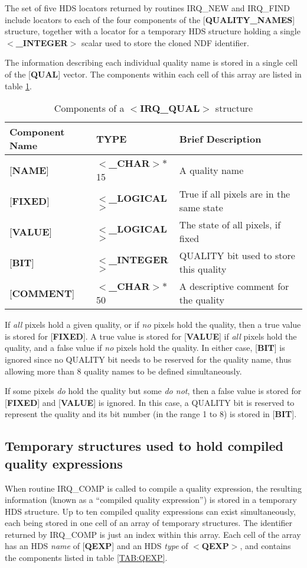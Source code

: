 The set of five HDS locators returned by routines IRQ\_NEW and IRQ\_FIND include
locators to each of the four components of the {[}{\bf QUALITY\_NAMES}{]}
structure, together with a locator for a temporary HDS structure holding a
single $<${\bf \_INTEGER}$>$ scalar used to store the cloned NDF identifier. 

The information describing each individual quality name is stored in a single
cell of the {[}{\bf QUAL}{]} vector. The components within each cell of this 
array are listed in table \ref {TAB:QUAL}.

\begin{table}[htb]
\centering
\caption{Components of a $<${\bf IRQ\_QUAL}$>$ structure}
\label{TAB:QUAL}
\begin{tabular}{|l|l|l|}
\hline
Component Name & TYPE & Brief Description \\ \hline
{[}{\bf NAME}{]} & $<${\bf \_CHAR}$>*$15 & A quality name \\
{[}{\bf FIXED}{]} & $<${\bf \_LOGICAL}$>$ & True if all pixels are in the same 
state\\
{[}{\bf VALUE}{]} & $<${\bf \_LOGICAL}$>$ & The state of all pixels, if fixed\\
{[}{\bf BIT}{]} & $<${\bf \_INTEGER}$>$ & QUALITY bit used to store this 
quality\\
{[}{\bf COMMENT}{]} & $<${\bf \_CHAR}$>*$50 & A descriptive comment for the 
quality\\
\hline
\end{tabular}
\end{table}

If {\em all} pixels hold a given quality, or if {\em no} pixels hold the
quality, then a true value is stored for {[}{\bf FIXED}{]}. A true value is
stored for {[}{\bf VALUE}{]} if {\em all} pixels hold the quality, and a false
value if {\em no} pixels hold the quality. In either case, {[}{\bf BIT}{]} is
ignored since no QUALITY bit needs to be reserved for the quality name, thus
allowing more than 8 quality names to be defined simultaneously. 

If some pixels {\em do} hold the quality but some {\em do not}, then a false 
value is stored for {[}{\bf FIXED}{]} and {[}{\bf VALUE}{]} is ignored. In this 
case, a QUALITY bit is reserved to represent the quality and its bit number (in 
the range 1 to 8) is stored in {[}{\bf BIT}{]}.

\subsection{Temporary structures used to hold compiled quality expressions}
When routine IRQ\_COMP is called to compile a quality expression, the resulting
information (known as a ``compiled quality expression'') is stored in a
temporary HDS structure. Up to ten compiled quality expressions can exist
simultaneously, each being stored in one cell of an array of temporary
structures. The identifier returned by IRQ\_COMP is just an index within this
array. Each cell of the array has an HDS {\em name} of {[}{\bf QEXP}{]} and an
HDS {\em type} of $<${\bf QEXP}$>$, and contains the components listed in table
\ref {TAB:QEXP}. 

